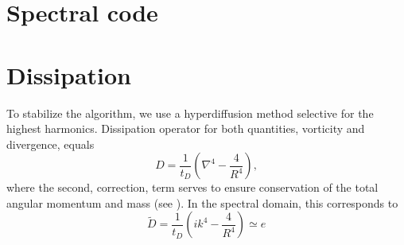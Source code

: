 \documentclass[usenatbib,onecolumn]{mnras}
\begin{document}
\section{Spectral code}

\section{Dissipation}

To stabilize the algorithm, we use a hyperdiffusion method selective for the
highest harmonics. Dissipation operator for both quantities, vorticity and
divergence, equals
\begin{equation}
\displaystyle  D = \frac{1}{t_{D}}\left(\nabla^4 - \frac{4}{R^4}\right),
\end{equation}
where the second, correction, term serves to ensure conservation of the total
angular momentum and mass (see \citet{swater}). In the spectral domain, this
corresponds to
\begin{equation}
\displaystyle   \tilde{D} = \frac{1}{t_{D}}\left( ik^4 -
\frac{4}{R^4}\right)\simeq e^{}
\end{equation}





\label{lastpage}
\end{document}
